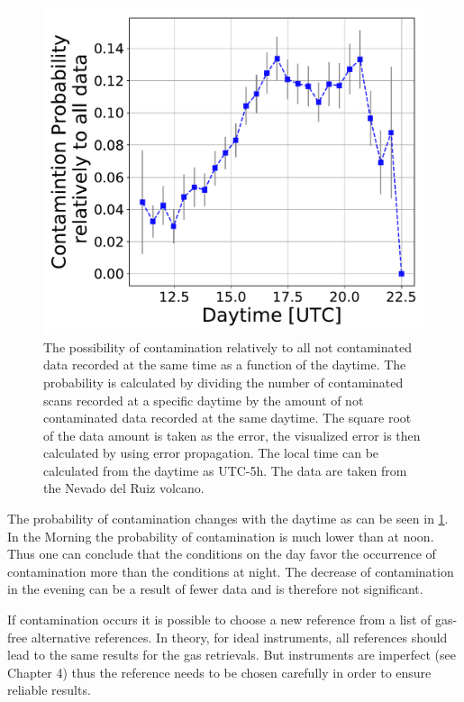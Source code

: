 \begin{figure}[h!]
	\centering
	\includegraphics[width=0.7\linewidth]{Bilder/ConProb}
	\caption[The possibility of contamination relatively to all not contaminated data recorded at the same time as a function of the daytime. The data are taken from the Nevado del Ruiz volcano.]{ The possibility of contamination relatively to all not contaminated data recorded at the same time as a function of the daytime. The probability is calculated by dividing the number of contaminated scans recorded at a specific daytime by the amount of not contaminated data recorded at the same daytime. The square root of the data amount is taken as the error, the visualized error is then calculated by using error propagation. The local time can be calculated from the daytime as UTC-5h. The data are taken from the Nevado del Ruiz volcano.}
	\label{fig:conprob}
\end{figure}
The probability of contamination changes with the daytime as can be seen in \cref{fig:conprob}. In the Morning the probability of contamination is much lower than at noon. Thus one can conclude that the conditions on the day favor the occurrence of contamination more than the conditions at night. The decrease of contamination in the evening can be a result of fewer data and is therefore not significant.

If contamination occurs it is possible to choose a new reference from a list of gas-free alternative references. In theory, for ideal instruments, all references should lead to
the same results for the gas retrievals. But instruments are imperfect (see Chapter
4) thus the reference needs to be chosen carefully in order to ensure reliable results.\\
%
\\


